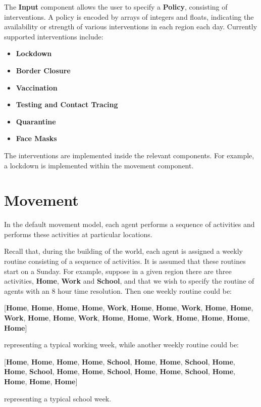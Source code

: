 \documentclass[10pt,letterpaper]{article}
\begin{document}
The \textbf{Input} component allows the user to specify a \textbf{Policy}, consisting of interventions. A policy is encoded by arrays of integers and floats, indicating the availability or strength of various interventions in each region each day. Currently supported interventions include:
\begin{itemize}
\item \textbf{Lockdown}
\item \textbf{Border Closure}
\item \textbf{Vaccination}
\item \textbf{Testing and Contact Tracing}
\item \textbf{Quarantine}
\item \textbf{Face Masks}
\end{itemize}
The interventions are implemented inside the relevant components. For example, a lockdown is implemented within the movement component.

\section{Movement}

In the default movement model, each agent performs a sequence of activities and performs these activities at particular locations.

Recall that, during the building of the world, each agent is assigned a weekly routine consisting of a sequence of activities. It is assumed that these routines start on a Sunday. For example, suppose in a given region there are three activities, \textbf{Home}, \textbf{Work} and \textbf{School}, and that we wish to specify the routine of agents with an 8 hour time resolution. Then one weekly routine could be:
\begin{center}
[\textbf{Home}, \textbf{Home}, \textbf{Home}, \textbf{Home}, \textbf{Work}, \textbf{Home}, \textbf{Home}, \textbf{Work}, \textbf{Home}, \textbf{Home}, \textbf{Work}, \textbf{Home}, \textbf{Home}, \textbf{Work}, \textbf{Home}, \textbf{Home}, \textbf{Work}, \textbf{Home}, \textbf{Home}, \textbf{Home}, \textbf{Home}]
\end{center}
representing a typical working week, while another weekly routine could be:
\begin{center}
[\textbf{Home}, \textbf{Home}, \textbf{Home}, \textbf{Home}, \textbf{School}, \textbf{Home}, \textbf{Home}, \textbf{School}, \textbf{Home}, \textbf{Home}, \textbf{School}, \textbf{Home}, \textbf{Home}, \textbf{School}, \textbf{Home}, \textbf{Home}, \textbf{School}, \textbf{Home}, \textbf{Home}, \textbf{Home}, \textbf{Home}]
\end{center}
representing a typical school week.
\end{document}
